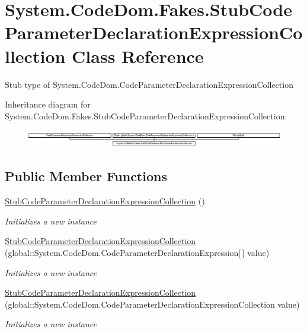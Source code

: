 \hypertarget{class_system_1_1_code_dom_1_1_fakes_1_1_stub_code_parameter_declaration_expression_collection}{\section{System.\-Code\-Dom.\-Fakes.\-Stub\-Code\-Parameter\-Declaration\-Expression\-Collection Class Reference}
\label{class_system_1_1_code_dom_1_1_fakes_1_1_stub_code_parameter_declaration_expression_collection}
}


Stub type of System.\-Code\-Dom.\-Code\-Parameter\-Declaration\-Expression\-Collection 


Inheritance diagram for System.\-Code\-Dom.\-Fakes.\-Stub\-Code\-Parameter\-Declaration\-Expression\-Collection\-:\begin{figure}[H]
\begin{center}
\leavevmode
\includegraphics[height=0.771350cm]{class_system_1_1_code_dom_1_1_fakes_1_1_stub_code_parameter_declaration_expression_collection}
\end{center}
\end{figure}
\subsection*{Public Member Functions}
\begin{DoxyCompactItemize}
\item 
\hyperlink{class_system_1_1_code_dom_1_1_fakes_1_1_stub_code_parameter_declaration_expression_collection_a680f9f453e43a6e45b4a5dfd683fef20}{Stub\-Code\-Parameter\-Declaration\-Expression\-Collection} ()
\begin{DoxyCompactList}\small\item\em Initializes a new instance\end{DoxyCompactList}\item 
\hyperlink{class_system_1_1_code_dom_1_1_fakes_1_1_stub_code_parameter_declaration_expression_collection_aba598bb25860128c4cf6ff8897a19791}{Stub\-Code\-Parameter\-Declaration\-Expression\-Collection} (global\-::\-System.\-Code\-Dom.\-Code\-Parameter\-Declaration\-Expression\mbox{[}$\,$\mbox{]} value)
\begin{DoxyCompactList}\small\item\em Initializes a new instance\end{DoxyCompactList}\item 
\hyperlink{class_system_1_1_code_dom_1_1_fakes_1_1_stub_code_parameter_declaration_expression_collection_a32bc4b84dafa6f87c7e05391d59bcdbf}{Stub\-Code\-Parameter\-Declaration\-Expression\-Collection} (global\-::\-System.\-Code\-Dom.\-Code\-Parameter\-Declaration\-Expression\-Collection value)
\begin{DoxyCompactList}\small\item\em Initializes a new instance\end{DoxyCompactList}\end{DoxyCompactItemize}
